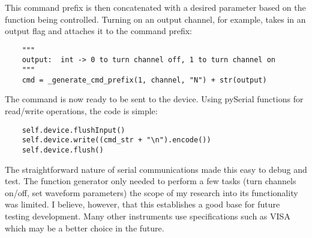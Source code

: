 This command prefix is then concatenated with a desired parameter based on the function being controlled. Turning on an output channel, for example, takes in an output flag and attaches it to the command prefix:
\begin{lstlisting}
	"""
	output:  int -> 0 to turn channel off, 1 to turn channel on
	"""
	cmd = _generate_cmd_prefix(1, channel, "N") + str(output)
\end{lstlisting}
The command is now ready to be sent to the device. Using pySerial functions for read/write operations, the code is simple:
\begin{lstlisting}
	self.device.flushInput()
	self.device.write((cmd_str + "\n").encode())
	self.device.flush()
\end{lstlisting}
The straightforward nature of serial communications made this easy to debug and test. The function generator only needed to perform a few tasks (turn channels on/off, set waveform parameters) the scope of my research into its functionality was limited. I believe, however, that this establishes a good base for future testing development. Many other instruments use specifications such as VISA which may be a better choice in the future.

